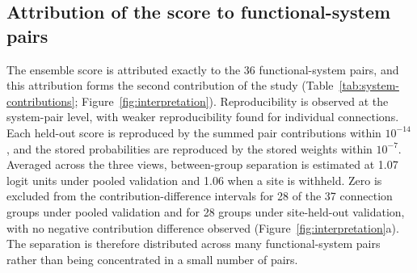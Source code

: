 \subsection{Attribution of the score to functional-system pairs}
\label{subsec:results-interpretation}

The ensemble score is attributed exactly to the 36 functional-system pairs, and this attribution forms the second contribution of the study (Table~\ref{tab:system-contributions}; Figure~\ref{fig:interpretation}). Reproducibility is observed at the system-pair level, with weaker reproducibility found for individual connections. Each held-out score is reproduced by the summed pair contributions within $10^{-14}$, and the stored probabilities are reproduced by the stored weights within $10^{-7}$. Averaged across the three views, between-group separation is estimated at 1.07 logit units under pooled validation and 1.06 when a site is withheld. Zero is excluded from the contribution-difference intervals for 28 of the 37 connection groups under pooled validation and for 28 groups under site-held-out validation, with no negative contribution difference observed (Figure~\ref{fig:interpretation}a). The separation is therefore distributed across many functional-system pairs rather than being concentrated in a small number of pairs.

